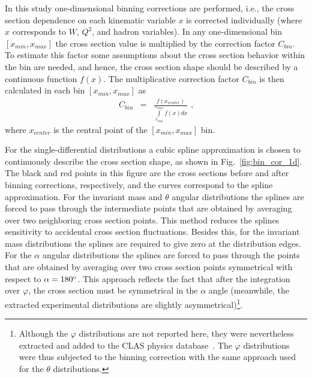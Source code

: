 In this study one-dimensional binning corrections are performed, i.e., the cross section dependence on each kinematic variable $x$ is corrected individually (where $x$ corresponds to $W$, $Q^{2}$, and hadron variables). In any one-dimensional bin $[x_{min},x_{max}]$ the cross section value is multiplied by the correction factor $C_{bin}$. To estimate this factor some assumptions about the cross section behavior within the bin are needed, and hence, the cross section shape should be described by a continuous function $f(x)$. The multiplicative correction factor $C_{bin}$ is then calculated in each bin $[x_{min},x_{max}]$ as
\begin{equation}
\begin{aligned}
\label{eq:bincor}
C_{bin} & = &\frac{f(x_{center})}{\int\limits_{x_{min}}^{x_{max}} f(x)dx} \textrm{ ,}
\end{aligned}  
\end{equation}
where $x_{center}$ is the central point of the $[x_{min},x_{max}]$ bin.


For the single-differential distributions a cubic spline approximation is chosen to continuously describe the cross section shape, as shown in Fig.~\ref{fig:bin_cor_1d}. The black and red points in this figure are the cross sections before and after binning corrections, respectively, and the curves correspond to the spline approximation. For the invariant mass and $\theta$ angular distributions the splines are forced to pass through the intermediate points that are obtained by averaging over two neighboring cross section points. This method reduces the splines sensitivity to accidental cross section fluctuations. Besides this, for the invariant mass distributions the splines are required to give zero at the distribution edges. For the $\alpha$ angular distributions the splines are forced to pass through the points that are obtained by averaging over two cross section points symmetrical with respect to $\alpha = 180^{\rm o}$. This approach reflects the fact that after the integration over $\varphi$, the cross section must be symmetrical in the $\alpha$ angle (meanwhile, the extracted experimental distributions are slightly asymmetrical)\footnote[5]{Although the $\varphi$ distributions are not reported here, they were nevertheless extracted and added to the CLAS physics database~\cite{CLAS_DB}. The $\varphi$ distributions were thus subjected to the binning correction with the same approach used for the $\theta$ distributions.}.

